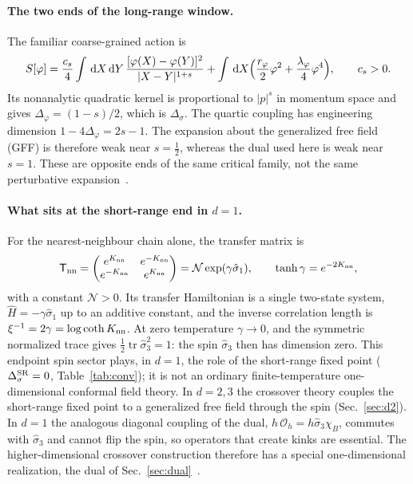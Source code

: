 \documentclass[11pt,a4paper]{article}
\numberwithin{equation}{section}
\newcommand{\dd}{\,\mathrm d}
\newcommand{\Ds}{\Delta_\sigma}
\newcommand{\Oh}{\mathcal O_h}
\begin{document}
\paragraph{The two ends of the long-range window.} The familiar coarse-grained action is
\begin{equation}
 S[\varphi]=\frac{c_s}{4}\int\dd X\dd Y\,\frac{[\varphi(X)-\varphi(Y)]^2}{|X-Y|^{1+s}}
 +\int\dd X\Bigl(\frac{r_\varphi}{2}\varphi^2+\frac{\lambda_\varphi}{4}\varphi^4\Bigr),\qquad c_s>0.
\end{equation}
Its nonanalytic quadratic kernel is proportional to $|p|^s$ in momentum space and gives $\Delta_\varphi=(1-s)/2$,
which is $\Ds$. The quartic coupling has engineering dimension $1-4\Delta_\varphi=2s-1$. The expansion about the
generalized free field (GFF) is therefore weak near $s=\frac12$, whereas the dual used here is weak near $s=1$. These
are opposite ends of the same critical family, not the same perturbative
expansion~\cite{Benedetti:2025nzp,Benedetti:2020rrq}.

\paragraph{What sits at the short-range end in $d=1$.} For the nearest-neighbour chain alone, the transfer matrix is
\begin{equation}
 \mathsf T_{\rm nn}=\begin{pmatrix}e^{K_{\rm nn}}&e^{-K_{\rm nn}}\\ e^{-K_{\rm nn}}&e^{K_{\rm nn}}\end{pmatrix}
 =\mathcal N\exp(\gamma\hat\sigma_1),\qquad \tanh\gamma=e^{-2K_{\rm nn}},
\end{equation}
with a constant $\mathcal N>0$. Its transfer Hamiltonian is a single two-state system, $\hat H=-\gamma\hat\sigma_1$ up
to an additive constant, and the inverse correlation length is $\xi^{-1}=2\gamma=\log\coth K_{\rm nn}$. At zero
temperature $\gamma\to0$, and the symmetric normalized trace gives $\frac12\operatorname{tr}\hat\sigma_3^2=1$: the
spin $\hat\sigma_3$ then has dimension zero. This endpoint spin sector plays, in $d=1$, the role of the
short-range fixed point ($\Ds^{\rm SR}=0$, Table~\ref{tab:conv}); it is not an ordinary finite-temperature
one-dimensional conformal field theory. In $d=2,3$ the crossover theory couples the short-range fixed point to a
generalized free field through the spin (Sec.~\ref{sec:d2}). In $d=1$ the analogous diagonal coupling
of the dual, $h\,\Oh=h\hat\sigma_3\chi_B$, commutes with $\hat\sigma_3$ and cannot flip the spin, so operators that create kinks are
essential. The higher-dimensional crossover construction therefore has a special one-dimensional realization, the
dual of Sec.~\ref{sec:dual}~\cite{Benedetti:2025nzp,Behan:2017dwr,Behan:2017emf}.
\end{document}
